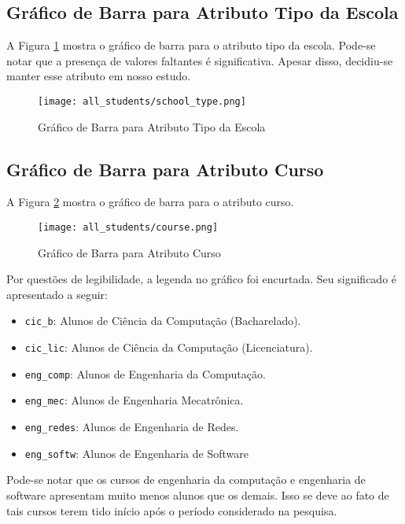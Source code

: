 \subsection{Gráfico de Barra para Atributo Tipo da Escola}
A Figura \ref{atr_school} mostra o gráfico de barra para o atributo tipo da escola.
Pode-se notar que a presença de valores faltantes é significativa. Apesar disso,
decidiu-se manter esse atributo em nosso estudo. 
\begin{figure}[!ht]
    \caption{Gráfico de Barra para Atributo Tipo da Escola}
    \centering
    \texttt{[image: all\_students/school\_type.png]}
    \label{atr_school}
\end{figure}

\subsection{Gráfico de Barra para Atributo Curso}
A Figura \ref{atr_course} mostra o gráfico de barra para o atributo curso. 

\begin{figure}[!ht]
    \caption{Gráfico de Barra para Atributo Curso}
    \centering
    \texttt{[image: all\_students/course.png]}
    \label{atr_course}
\end{figure}

Por questões de legibilidade, a legenda no gráfico foi encurtada. Seu significado é
apresentado a seguir: 
\begin{itemize}
    \item \texttt{cic\_b}: Alunos de Ciência da Computação (Bacharelado).
    \item \texttt{cic\_lic}: Alunos de Ciência da Computação (Licenciatura).
    \item \texttt{eng\_comp}: Alunos de Engenharia da Computação.
    \item \texttt{eng\_mec}: Alunos de Engenharia Mecatrônica.
    \item \texttt{eng\_redes}: Alunos de Engenharia de Redes. 
    \item \texttt{eng\_softw}: Alunos de Engenharia de Software
\end{itemize}

Pode-se notar que os cursos de engenharia da computação e engenharia de software
apresentam muito menos alunos que os demais. Isso se deve ao fato de tais cursos
terem tido início após o período considerado na pesquisa. 
\clearpage

